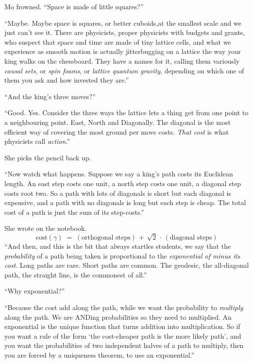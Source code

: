 Mo frowned. ``Space is made of little squares?''
 
``Maybe. Maybe space is squares, or better cuboids,at the smallest scale and we just
can't see it. There are physicists, proper physicists with budgets and grants, who suspect that space and time are made of tiny lattice cells, and what we experience as smooth motion is actually jitterbugging
on a lattice the way your king walks on the chessboard. They have
a names for it, calling them variously \emph{causal sets}, or \emph{spin foams},
or \emph{lattice quantum gravity}, depending on which one of them you ask and how invested they are.''
 
``And the king's three moves?''
 
``Good. Yes. Consider the three ways the lattice lets a thing get from one point to a neighbouring point. East, North and Diagonally. The diagonal is the most efficient way of covering the most ground per move costs. \emph{That cost} is what physicists call \emph{action}.''
 
She picks the pencil back up.
 
``Now watch what happens. Suppose we say a king's path costs its
Euclidean length. An east step costs one unit, a north step costs
one unit, a diagonal step costs root two. So a path with lots of
diagonals is short but each diagonal is expensive, and a path with
no diagonals is long but each step is cheap. The total cost of a
path is just the sum of its step-costs.''
 
She wrote on the notebook.
\[ \text{cost}(\gamma) \;=\; (\text{orthogonal steps})
   \,+\, \sqrt{2} \,\cdot\, (\text{diagonal steps})
\]
``And then, and this is the bit that always startles students, we
say that the \emph{probability} of a path being taken is
proportional to the \emph{exponential of minus its cost}. Long paths
are rare. Short paths are common. The geodesic, the all-diagonal
path, the straight line, is the commonest of all.''
 
``Why exponential?''
 
``Because the cost add along the path, while we want the probability to \emph{multiply} along the path. We are ANDing probabilities so they need to multiplied. An exponential is the unique
function that turns addition into multiplication. So if you want a
rule of the form `the cost-cheaper path is the more likely path', and you want the probabilities of two independent halves of a path to multiply, then you are forced by a uniqueness theorem, to use an
exponential.''
 
